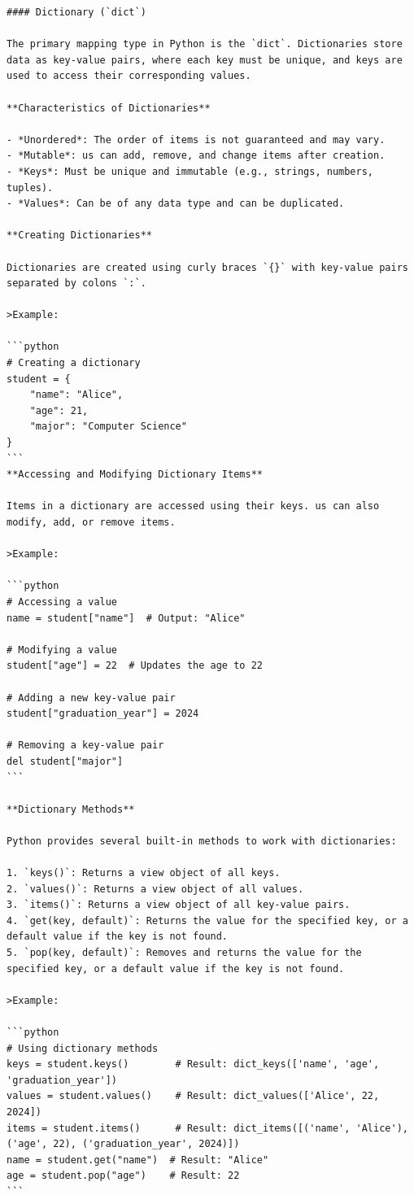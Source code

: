 \documentclass[
  letterpaper,
  DIV=11,
  numbers=noendperiod]{scrreprt}
\theoremstyle{plain}
\theoremstyle{definition}
\theoremstyle{remark}
\begin{document}
\begin{verbatim}
#### Dictionary (`dict`)

The primary mapping type in Python is the `dict`. Dictionaries store data as key-value pairs, where each key must be unique, and keys are used to access their corresponding values.

**Characteristics of Dictionaries**

- *Unordered*: The order of items is not guaranteed and may vary.
- *Mutable*: us can add, remove, and change items after creation.
- *Keys*: Must be unique and immutable (e.g., strings, numbers, tuples).
- *Values*: Can be of any data type and can be duplicated.

**Creating Dictionaries**

Dictionaries are created using curly braces `{}` with key-value pairs separated by colons `:`.

>Example:

```python
# Creating a dictionary
student = {
    "name": "Alice",
    "age": 21,
    "major": "Computer Science"
}
```
**Accessing and Modifying Dictionary Items**

Items in a dictionary are accessed using their keys. us can also modify, add, or remove items.

>Example:

```python
# Accessing a value
name = student["name"]  # Output: "Alice"

# Modifying a value
student["age"] = 22  # Updates the age to 22

# Adding a new key-value pair
student["graduation_year"] = 2024

# Removing a key-value pair
del student["major"]
```

**Dictionary Methods**

Python provides several built-in methods to work with dictionaries:

1. `keys()`: Returns a view object of all keys.
2. `values()`: Returns a view object of all values.
3. `items()`: Returns a view object of all key-value pairs.
4. `get(key, default)`: Returns the value for the specified key, or a default value if the key is not found.
5. `pop(key, default)`: Removes and returns the value for the specified key, or a default value if the key is not found.

>Example:

```python
# Using dictionary methods
keys = student.keys()        # Result: dict_keys(['name', 'age', 'graduation_year'])
values = student.values()    # Result: dict_values(['Alice', 22, 2024])
items = student.items()      # Result: dict_items([('name', 'Alice'), ('age', 22), ('graduation_year', 2024)])
name = student.get("name")  # Result: "Alice"
age = student.pop("age")    # Result: 22
```


\end{verbatim}
\end{document}
